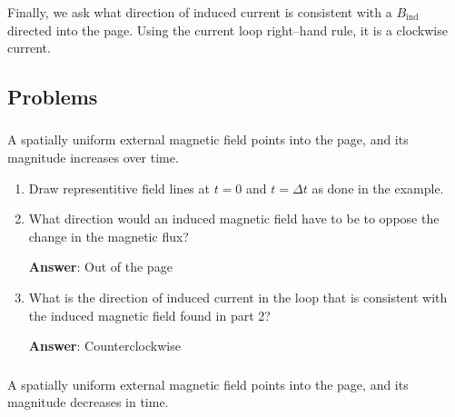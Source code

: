 \documentclass{article}
\begin{document}
Finally, we ask what direction of induced current is consistent with a $B_{\text{ind}}$ directed into the page. Using the current loop right--hand rule, it is a clockwise current.



\newpage

\subsection{Problems}

\subsubsection{}

A spatially uniform external magnetic field points into the page, and its magnitude increases over time.



\begin{enumerate}

  \item Draw representitive field lines at $t=0$ and $t=\Delta t$ as done in the example.

        \ifsolutions

        \else

        
        \fi

  \item What direction would an induced magnetic field have to be to oppose the change in the magnetic flux?

        \ifsolutions
        {\bf Answer}: Out of the page
        \else

        \fi

  \item What is the direction of induced current in the loop that is consistent with the induced magnetic field found in part 2?

        \ifsolutions
        {\bf Answer}: Counterclockwise
        \else

        \fi

\end{enumerate}

\subsubsection{}

A spatially uniform external magnetic field points into the page, and its magnitude decreases in time.
\end{document}
